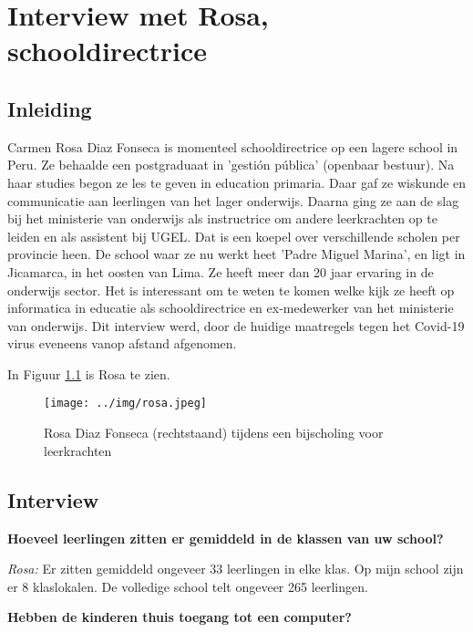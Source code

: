 
\chapter{Interview met Rosa, schooldirectrice}
\label{ch:interviewRosa}

\section{Inleiding}
Carmen Rosa Diaz Fonseca is momenteel schooldirectrice op een lagere school in Peru. Ze behaalde een postgraduaat in 'gestión pública' (openbaar bestuur). Na haar studies begon ze les te geven in education primaria. Daar gaf ze wiskunde en communicatie aan leerlingen van het lager onderwijs. Daarna ging ze aan de slag bij het ministerie van onderwijs als instructrice om andere leerkrachten op te leiden en als assistent bij UGEL. Dat is een koepel over verschillende scholen per provincie heen. De school waar ze nu werkt heet 'Padre Miguel Marina', en ligt in Jicamarca, in het oosten van Lima. Ze heeft meer dan 20 jaar ervaring in de onderwijs sector. Het is interessant om te weten te komen welke kijk ze heeft op informatica in educatie als schooldirectrice en ex-medewerker van het ministerie van onderwijs. Dit interview werd, door de huidige maatregels tegen het Covid-19 virus eveneens vanop afstand afgenomen.

In Figuur \ref{rosa} is Rosa te zien.

\begin{figure}[h!]
	\texttt{[image: ../img/rosa.jpeg]}
	\caption{Rosa Diaz Fonseca (rechtstaand) tijdens een bijscholing voor leerkrachten }
	\label{rosa}
\end{figure}


\section{Interview}

\textbf{Hoeveel leerlingen zitten er gemiddeld in de klassen van uw school?}

\textit{Rosa:} Er zitten gemiddeld ongeveer 33 leerlingen in elke klas. Op mijn school zijn er 8 klaslokalen. De volledige school telt ongeveer 265 leerlingen.

\textbf{Hebben de kinderen thuis toegang tot een computer?}

